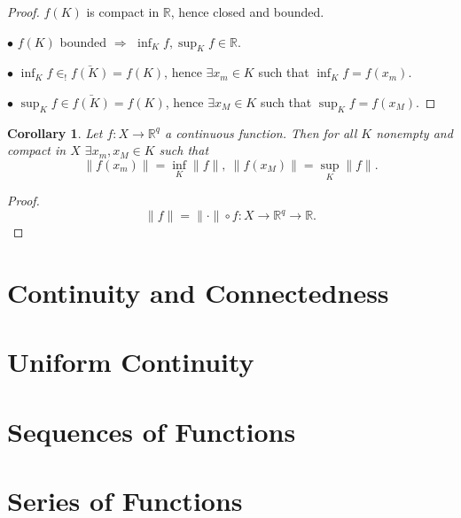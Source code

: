 \documentclass[12pt]{amsbook}
\newtheorem{corollary}[theorem]{Corollary}
\theoremstyle{definition}
\newcommand{\RR}{{\mathbb R}}
\newcommand{\Ra}{\Rightarrow} %
\newcommand{\ra}{\rightarrow} %
\begin{document}

\begin{proof}
$f(K)$ is compact in $\RR$, hence closed and bounded.

$\bullet$ $f(K)$ bounded $\Ra$ $\inf_K f, \sup_K f \in \RR$.

$\bullet$ $\inf_K f \in_! \bar{f(K)} = f(K)$, hence $\exists x_m \in K$ such that $\inf_K f = f(x_m)$. 

$\bullet$ $\sup_K f \in \bar{f(K)} = f(K)$, hence $\exists x_M \in K$ such that $\sup_K f = f(x_M)$. 
\end{proof}

\begin{corollary}
Let $f: X \ra \RR^q$ a continuous function. Then for all $K$ nonempty and compact in $X$ $\exists x_m, x_M \in K$ such that 
\begin{equation*} \|f(x_m)\| = \inf_K \|f\|, \ \|f(x_M)\| = \sup_K \|f\|.\end{equation*}
\end{corollary}

\begin{proof}
\begin{equation*} \|f\| = \|\cdot\| \circ f : X \ra \RR^q \ra \RR. \end{equation*}
\end{proof}

\section{Continuity and Connectedness}

\section{Uniform Continuity}

\section{Sequences of Functions}

\section{Series of Functions}
\end{document}
